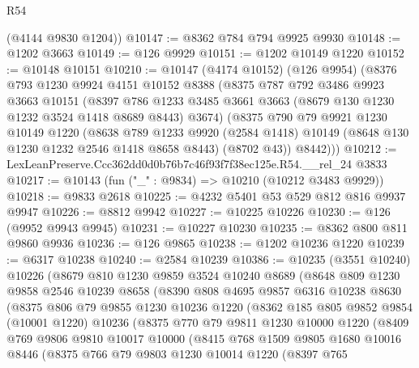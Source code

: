 \begin{lexlean}{R54}
\begin{coremodule}
      (@4144 @9830 @1204))
@10147 := @8362 @784 @794 @9925 @9930
@10148 := @1202 @3663
@10149 := @126 @9929
@10151 := @1202 @10149 @1220
@10152 := @10148 @10151
@10210 := @10147
    (@4174 @10152)
    (@126 @9954)
    (@8376
      @793
      @1230
      @9924
      @4151
      @10152
      @8388
      (@8375
        @787
        @792
        @3486
        @9923
        @3663
        @10151
        (@8397 @786 @1233 @3485 @3661 @3663 (@8679 @130 @1230 @1232 @3524 @1418 @8689 @8443) @3674)
        (@8375
          @790
          @79
          @9921
          @1230
          @10149
          @1220
          (@8638
            @789
            @1233
            @9920
            (@2584 @1418)
            @10149
            (@8648 @130 @1230 @1232 @2546 @1418 @8658 @8443)
            (@8702 @43))
          @8442)))
@10212 := LexLeanPreserve.Ccc362dd0d0b76b7c46f93f7f38ec125e.R54.__rel_24 @3833
@10217 := @10143 (fun ("_" : @9834) => @10210 (@10212 @3483 @9929))
@10218 := @9833 @2618
@10225 := @4232 @5401 @53 @529 @812 @816 @9937 @9947
@10226 := @8812 @9942
@10227 := @10225 @10226
@10230 := @126 (@9952 @9943 @9945)
@10231 := @10227 @10230
@10235 := @8362 @800 @811 @9860 @9936
@10236 := @126 @9865
@10238 := @1202 @10236 @1220
@10239 := @6317 @10238
@10240 := @2584 @10239
@10386 := @10235
    (@3551 @10240)
    @10226
    (@8679
      @810
      @1230
      @9859
      @3524
      @10240
      @8689
      (@8648
        @809
        @1230
        @9858
        @2546
        @10239
        @8658
        (@8390
          @808
          @4695
          @9857
          @6316
          @10238
          @8630
          (@8375
            @806
            @79
            @9855
            @1230
            @10236
            @1220
            (@8362
              @185
              @805
              @9852
              @9854
              (@10001 @1220)
              @10236
              (@8375
                @770
                @79
                @9811
                @1230
                @10000
                @1220
                (@8409
                  @769
                  @9806
                  @9810
                  @10017
                  @10000
                  (@8415
                    @768
                    @1509
                    @9805
                    @1680
                    @10016
                    @8446
                    (@8375
                      @766
                      @79
                      @9803
                      @1230
                      @10014
                      @1220
                      (@8397
                        @765

\end{coremodule}
\end{lexlean}

